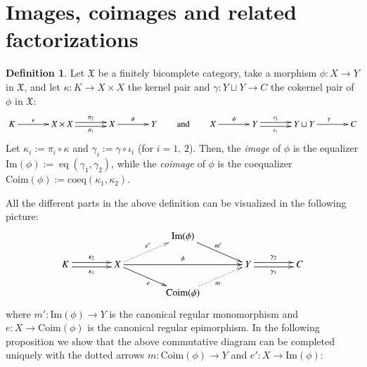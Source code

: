 \documentclass[12pt]{article}
\theoremstyle{definition}
\newtheorem{definition}[lemma]{Definition}
\def\X{\mathfrak X}
\def\Coim{\mathrm{Coim}}
\def\coeq{\mathrm{coeq}}
\def\Im{\mathrm{Im}}
\DeclareMathOperator{\eq}{eq}
\numberwithin{equation}{section}
\begin{document}
\section{Images, coimages and related factorizations}

\begin{definition}
Let $\X$ be a finitely bicomplete category, take   a morphism $\phi\colon X\to Y$ in $\X$, and let $\kappa\colon K\to X\times X$ the kernel pair and $\gamma\colon Y\sqcup Y\to C$ the cokernel pair of $\phi$ in $\X$:
\[
\xymatrix@C=35pt{
K\ar[r]^-\kappa& X\times X \ar@<-.5ex>[r]_-{\pi_1} \ar@<.5ex>[r]^-{\pi_2} &X\ar[r]^{\phi}&Y
}
\qquad \text{and}\qquad
\xymatrix@C=35pt{
X\ar[r]^-\phi& Y \ar@<-.5ex>[r]_-{\iota_1} \ar@<.5ex>[r]^-{\iota_2} &Y\sqcup Y\ar[r]^{\gamma}&C
}
\]
Let $\kappa_i:=\pi_i\circ \kappa$ and $\gamma_i:=\gamma\circ \iota_i$ (for $i=1,\,2$). Then, the {\em image} of $\phi$ is the equalizer $\Im(\phi):=\eq(\gamma_1,\gamma_2)$, while the {\em coimage} of $\phi$ is the coequalizer $\Coim(\phi):=\coeq(\kappa_1,\kappa_2)$. 
\end{definition}

All the different parts in the above definition can be visualized in the following picture:
\begin{equation}\label{BIG:diagram}
\xymatrix@C=40pt@R=15pt{
 && \Im(\phi) \ar[dr]^{m'}  & & \\ 
K \ar@<-.5ex>[r]_-{\kappa_1} \ar@<.5ex>[r]^-{\kappa_2} &X\ar@{.>}[ur]^{e'} \ar[rr]^(0.5){\phi}\ar[dr]_{e}&  & Y \ar@<-.5ex>[r]_-{\gamma_1} \ar@<.5ex>[r]^-{\gamma_2} & C\\
& & \Coim(\phi)\ar@{.>}[ru]_m  &  &
}
\end{equation}
where $m'\colon\Im(\phi)\to Y$ is the canonical regular monomorphism and $e\colon X\to \Coim(\phi)$ is the canonical regular epimorphism. In the following proposition we show that the above commutative diagram can be completed uniquely with the dotted arrows $m\colon \Coim(\phi)\to Y$ and $e'\colon X\to \Im(\phi)$:
\end{document}
